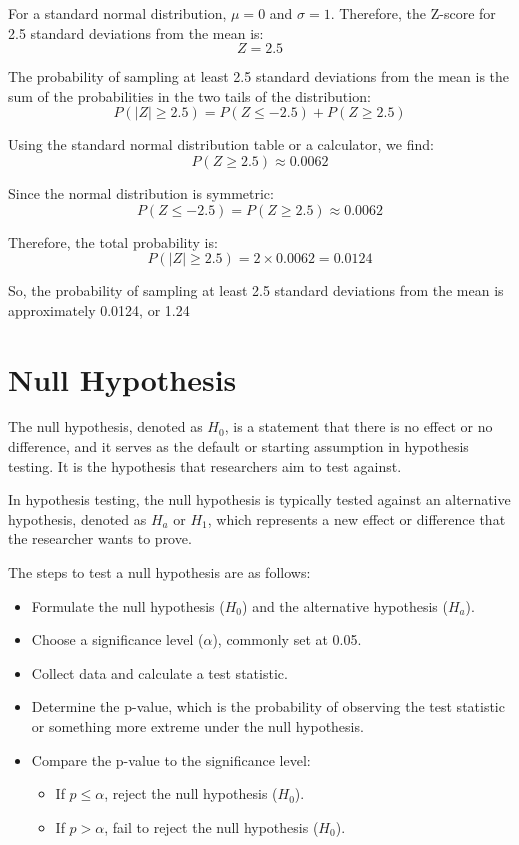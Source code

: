 \documentclass{article}
\begin{document}
For a standard normal distribution, \(\mu = 0\) and \(\sigma = 1\). Therefore, the Z-score for 2.5 standard deviations from the mean is:
\[
Z = 2.5
\]

The probability of sampling at least 2.5 standard deviations from the mean is the sum of the probabilities in the two tails of the distribution:
\[
P(|Z| \geq 2.5) = P(Z \leq -2.5) + P(Z \geq 2.5)
\]

Using the standard normal distribution table or a calculator, we find:
\[
P(Z \geq 2.5) \approx 0.0062
\]

Since the normal distribution is symmetric:
\[
P(Z \leq -2.5) = P(Z \geq 2.5) \approx 0.0062
\]

Therefore, the total probability is:
\[
P(|Z| \geq 2.5) = 2 \times 0.0062 = 0.0124
\]

So, the probability of sampling at least 2.5 standard deviations from the mean is approximately 0.0124, or 1.24%

\section{Null Hypothesis}
The null hypothesis, denoted as \(H_0\), is a statement that there is no effect or no difference, and it serves as the default or starting assumption in hypothesis testing. It is the hypothesis that researchers aim to test against.

In hypothesis testing, the null hypothesis is typically tested against an alternative hypothesis, denoted as \(H_a\) or \(H_1\), which represents a new effect or difference that the researcher wants to prove.

The steps to test a null hypothesis are as follows:
\begin{itemize}
    \item Formulate the null hypothesis (\(H_0\)) and the alternative hypothesis (\(H_a\)).
    \item Choose a significance level (\(\alpha\)), commonly set at 0.05.
    \item Collect data and calculate a test statistic.
    \item Determine the p-value, which is the probability of observing the test statistic or something more extreme under the null hypothesis.
    \item Compare the p-value to the significance level:
    \begin{itemize}
        \item If \(p \leq \alpha\), reject the null hypothesis (\(H_0\)).
        \item If \(p > \alpha\), fail to reject the null hypothesis (\(H_0\)).
    \end{itemize}
\end{itemize}
\end{document}
